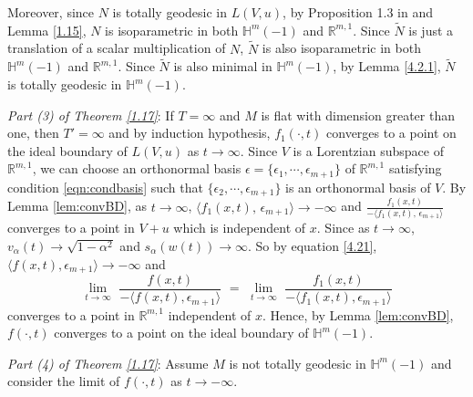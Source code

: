 \documentclass[12pt]{article}
\begin{document}
Moreover, since $N$ is totally geodesic in $L(V,u)$, by Proposition 1.3 in \cite{B.W} and Lemma \ref{1.15}, $N$ is isoparametric in  both $\mathbb{H}^m(-1)$ and $\mathbb R^{m,1}$.
Since $\tilde{N}$ is just a translation of a scalar multiplication of $N$,
$\tilde{N}$ is  also isoparametric in  both $\mathbb{H}^m(-1)$ and $\mathbb R^{m,1}$.
Since $\tilde{N}$ is also minimal in $\mathbb{H}^m(-1)$, by Lemma \ref{4.2.1},
$\tilde{N}$ is totally geodesic in $\mathbb{H}^m(-1)$.


{\it Part (3) of Theorem \ref{1.17}}: If $T=\infty$  and $M$ is flat with dimension greater than one, then $T'=\infty$ and by induction hypothesis, $f_1(\cdot, t)$
converges to a point on the ideal boundary of $L(V,u)$ as $t \rightarrow \infty$.
Since $V$ is a Lorentzian subspace of $\mathbb{R}^{m,1}$,
we can choose an orthonormal basis $\epsilon=\{\epsilon_1, \cdots, \epsilon_{m+1}\}$ of $\mathbb{R}^{m,1}$
satisfying condition \eqref{eqn:condbasis} such that $\{ \epsilon_2, \cdots, \epsilon_{m+1} \}$ is an orthonormal
basis of $V$. 
By Lemma \ref{lem:convBD}, as $t \rightarrow \infty$, $ \langle f_1(x,t), \, \epsilon_{m+1}\rangle \rightarrow -\infty$ and
$\frac{f_1(x, t)}{-\langle f_1(x,t), \, \epsilon_{m+1}\rangle}$ converges to a point in $V+u$
which is independent of $x$.
Since as $t \rightarrow \infty$,
$v_\alpha(t) \rightarrow \sqrt{1-\alpha^2}$ and
$s_{\alpha}(w(t)) \rightarrow \infty$.
So by equation \eqref{4.21},
$ \langle f(x,t), \epsilon_{m+1}\rangle \rightarrow -\infty$ and
\[ \lim_{t \rightarrow \infty} \,\, \frac{f(x, t)}{-\langle f(x,t), \epsilon_{m+1}\rangle}
  \,\, = \,\, \lim_{t \rightarrow \infty}  \,\, \frac{f_1(x, t)}{-\langle f_1(x,t), \epsilon_{m+1}\rangle} \]
  converges to a point in $\mathbb{R}^{m,1}$ independent of $x$. 
Hence, by Lemma \ref{lem:convBD}, $f(\cdot, t)$ converges to a point on the ideal boundary of $\mathbb{H}^m(-1)$.

{\it Part (4) of Theorem \ref{1.17}}:
Assume $M$ is not totally geodesic in $\mathbb{H}^m(-1)$ and consider the limit of $f(\cdot, t)$ as $t \rightarrow -\infty$.
\end{document}
